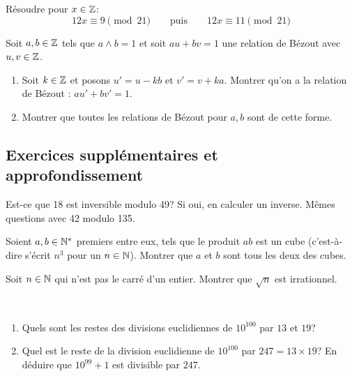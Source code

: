 \begin{td-exo}[Congruences] %
Résoudre pour $x\in\mathbb{Z}$:
\[
	12x\equiv 9\pmod{21}\qquad\text{puis}\qquad 12x\equiv 11\pmod{21}
\]

\end{td-exo}

\begin{td-exo} %
	Soit $a,b\in\mathbb{Z}$ tels que $a\wedge b=1$ et soit $au+bv=1$ une relation de Bézout avec $u,v\in\mathbb{Z}$.
	\begin{enumerate}[1)]
		\item Soit $k\in\mathbb{Z}$ et posons $u'=u-kb$ et $v'=v+ka$. Montrer qu'on a la relation de Bézout : $au'+bv'=1$.
		
		\item Montrer que toutes les relations de Bézout pour $a,b$ sont de cette forme.
	\end{enumerate}
	
\end{td-exo}

\subsection*{Exercices supplémentaires et approfondissement}\label{sec:tutorial_1_exo_sup}

\begin{td-exo} %
	Est-ce que 18 est inversible modulo 49? Si oui, en calculer un inverse. Mêmes questions avec 42 modulo 135.
	
\end{td-exo}

\begin{td-exo}[Cubes] %
	Soient $a,b\in\mathbb{N}^\ast$ premiers entre eux, tels que le produit $ab$ est un cube (c'est-à-dire s'écrit $n^3$ pour un $n\in\mathbb{N}$). Montrer que $a$ et $b$ sont tous les deux des cubes.
	
\end{td-exo}

\begin{td-exo}[Racine] %
	Soit $n\in\mathbb{N}$ qui n'est pas le carré d'un entier. Montrer que $\sqrt n$ est irrationnel.
	
\end{td-exo}

\begin{td-exo}\, %
	\begin{enumerate}[1)]
		\item Quels sont les restes des divisions euclidiennes de $10^{100}$ par $13$ et $19$?
		
		\item Quel est le reste de la division euclidienne de $10^{100}$ par $247=13\times 19$? En déduire que 
		$10^{99}+1$ est divisible par $247$.
		
	\end{enumerate}
	
\end{td-exo}

